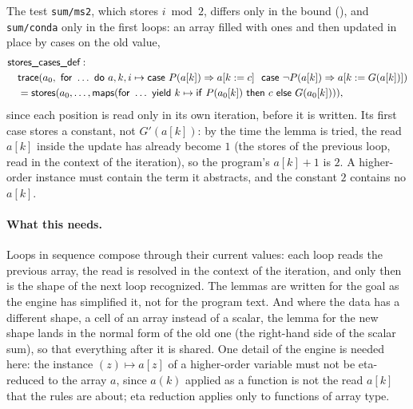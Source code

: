 The test \texttt{sum/ms2}, which stores $i \bmod 2$, differs only in the bound (), and
\texttt{sum/conda} only in the first loops: an array filled with ones and then updated in place by cases on the
old value,
\begin{align*}
  &\lemma{stores\_cases\_def}:\\
  &\quad \tr{a_0}{\ldots}{a, k, i \mapsto \upd{P(a[k])}{a[k := c]}\ \ \upd{\neg P(a[k])}{a[k := G(a[k])]}}\\
  &\quad = \mathsf{stores}(a_0, \ldots, \mapc{\ldots}{k \mapsto \ite{P(a_0[k])}{c}{G(a_0[k])}}),
\end{align*}
since each position is read only in its own iteration, before it is written. Its first case stores a constant, not
$G'(a[k])$: by the time the lemma is tried, the read $a[k]$ inside the update has already become $1$ (the stores of
the previous loop, read in the context of the iteration), so the program's $a[k] + 1$ is $2$. A higher-order
instance must contain the term it abstracts, and the constant $2$ contains no $a[k]$.

\paragraph{What this needs.} Loops in sequence compose through their current values: each loop reads the previous
array, the read is resolved in the context of the iteration, and only then is the shape of the next loop recognized.
The lemmas are written for the goal as the engine has simplified it, not for the program text. And where the data has
a different shape, a cell of an array instead of a scalar, the lemma for the new shape lands in the normal form of the
old one (the right-hand side of the scalar sum), so that everything after it is shared. One detail of the engine is
needed here: the instance $(z) \mapsto a[z]$ of a higher-order variable must not be eta-reduced to the array $a$,
since $a(k)$ applied as a function is not the read $a[k]$ that the rules are about; eta reduction applies only to
functions of array type.

